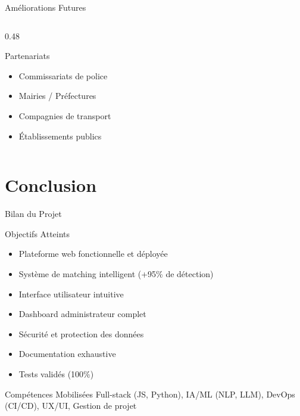 \documentclass[aspectratio=169]{beamer}
\begin{document}
\begin{frame}{Améliorations Futures}
\begin{columns}[T]
\begin{column}{0.48\textwidth}
            \begin{block}{Partenariats}
                \begin{itemize}
                    \item Commissariats de police
                    \item Mairies / Préfectures
                    \item Compagnies de transport
                    \item Établissements publics
                \end{itemize}
            \end{block}
        \end{column}
    \end{columns}
\end{frame}

\section{Conclusion}

\begin{frame}{Bilan du Projet}
    \begin{block}{Objectifs Atteints}
        \begin{itemize}
            \item \textcolor{vertSucces}{\faCheckCircle} Plateforme web fonctionnelle et déployée
            \item \textcolor{vertSucces}{\faCheckCircle} Système de matching intelligent (+95\% de détection)
            \item \textcolor{vertSucces}{\faCheckCircle} Interface utilisateur intuitive
            \item \textcolor{vertSucces}{\faCheckCircle} Dashboard administrateur complet
            \item \textcolor{vertSucces}{\faCheckCircle} Sécurité et protection des données
            \item \textcolor{vertSucces}{\faCheckCircle} Documentation exhaustive
            \item \textcolor{vertSucces}{\faCheckCircle} Tests validés (100\%)
        \end{itemize}
    \end{block}

    \vspace{0.3cm}

    \begin{exampleblock}{Compétences Mobilisées}
        Full-stack (JS, Python), IA/ML (NLP, LLM), DevOps (CI/CD), UX/UI, Gestion de projet
    \end{exampleblock}
\end{frame}
\end{document}
